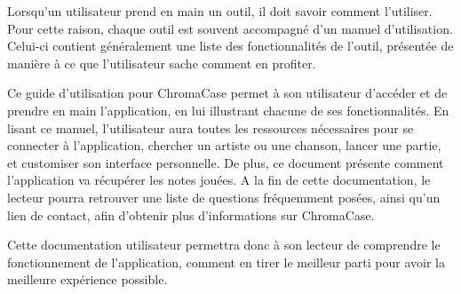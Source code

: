 Lorsqu’un utilisateur prend en main un outil, il doit savoir comment l’utiliser. Pour cette raison, chaque outil est souvent accompagné d’un manuel d’utilisation. Celui-ci contient généralement une liste des fonctionnalités de l’outil, présentée de manière à ce que l’utilisateur sache comment en profiter.

Ce guide d’utilisation pour ChromaCase permet à son utilisateur d’accéder et de prendre en main l’application, en lui illustrant chacune de ses fonctionnalités.
En lisant ce manuel, l’utilisateur aura toutes les ressources nécessaires pour se connecter à l’application, chercher un artiste ou une chanson, lancer une partie, et customiser son interface personnelle. De plus, ce document présente comment l’application va récupérer les notes jouées. A la fin de cette documentation, le lecteur pourra retrouver une liste de questions fréquemment posées, ainsi qu’un lien de contact, afin d’obtenir plus d'informations sur ChromaCase.

Cette documentation utilisateur permettra donc à son lecteur de comprendre le fonctionnement de l’application, comment en tirer le meilleur parti pour avoir la meilleure expérience possible.
